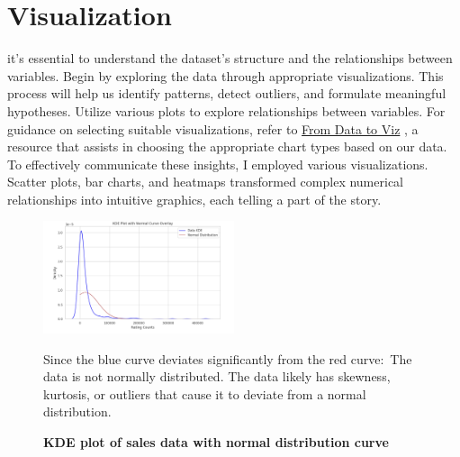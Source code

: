 \documentclass[a4paper]{article}
\begin{document}
\section{Visualization}
it’s essential to understand the dataset’s structure and the relationships between variables. Begin by exploring the data through appropriate visualizations. This process will help us identify patterns, detect outliers, and formulate meaningful hypotheses.
Utilize various plots to explore relationships between variables. For
guidance on selecting suitable visualizations, refer to \href{https://www.data-to-viz.com/}{From Data to Viz} , a resource that assists in choosing the appropriate chart types based on our data.
To effectively communicate these insights, I employed various visualizations. Scatter plots, bar charts, and heatmaps transformed complex numerical relationships into intuitive graphics, each telling a part of the story.

\begin{figure}[h]
    \centering
    \includegraphics[width=0.5\textwidth]{KDE Plot with Normal Curve Overlay.png}
    \caption{\textbf{KDE plot of sales data with normal distribution curve}}
    Since the blue curve deviates significantly from the red curve:\
    The data is not normally distributed.
    The data likely has skewness, kurtosis, or outliers that cause it to deviate from a normal distribution.
    \label{fig:sales}
\end{figure}
\end{document}
